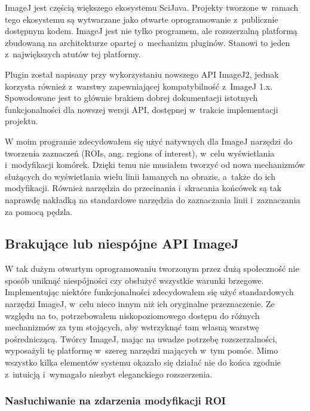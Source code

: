 \documentclass[declaration,shortabstract,mgr]{iithesis}
\begin{document}
ImageJ jest częścią większego ekosystemu SciJava.
Projekty tworzone w~ramach tego ekosystemu są wytwarzane jako otwarte oprogramowanie z~publicznie dostępnym kodem.
ImageJ jest nie tylko programem, ale rozszerzalną platformą zbudowaną na architekturze opartej o~mechanizm pluginów.
Stanowi to jeden z~największych atutów tej platformy\cite{imagej:philosophy}.

Plugin został napisany przy wykorzystaniu nowszego API ImageJ2, jednak korzysta również z~warstwy zapewniającej kompatybilność z~ImageJ 1.x.
Spowodowane jest to głównie brakiem dobrej dokumentacji istotnych funkcjonalności dla nowszej wersji API, dostępnej w~trakcie implementacji projektu.

W moim programie zdecydowałem się użyć natywnych dla ImageJ narzędzi do tworzenia zaznaczeń (ROIs, ang. regions of interest), w~celu wyświetlania i~modyfikacji komórek.
Dzięki temu nie musiałem tworzyć od nowa mechanizmów służących do wyświetlania wielu linii łamanych na obrazie, a~także do ich modyfikacji.
Również narzędzia do przecinania i~skracania końcówek są tak naprawdę nakładką na standardowe narzędzia do zaznaczania linii i~zaznaczania za pomocą pędzla.

\subsection{Brakujące lub niespójne API ImageJ}

W tak dużym otwartym oprogramowaniu tworzonym przez dużą społeczność nie sposób uniknąć niespójności czy obsłużyć wszystkie warunki brzegowe.
Implementując niektóre funkcjonalności zdecydowałem się użyć standardowych narzędzi ImageJ, w~celu nieco innym niż ich oryginalne przeznaczenie.
Ze względu na to, potrzebowałem niskopoziomowego dostępu do różnych mechanizmów za tym stojących, aby wstrzyknąć tam własną warstwę pośredniczącą.
Twórcy ImageJ, mając na uwadze potrzebę rozszerzalności, wyposażyli tę platformę w~szereg narzędzi mających w~tym pomóc.
Mimo wszystko kilka elementów systemu okazało się działać nie do końca zgodnie z~intuicją i~wymagało niezbyt eleganckiego rozszerzenia.

\subsubsection{Nasłuchiwanie na zdarzenia modyfikacji ROI}
\end{document}
